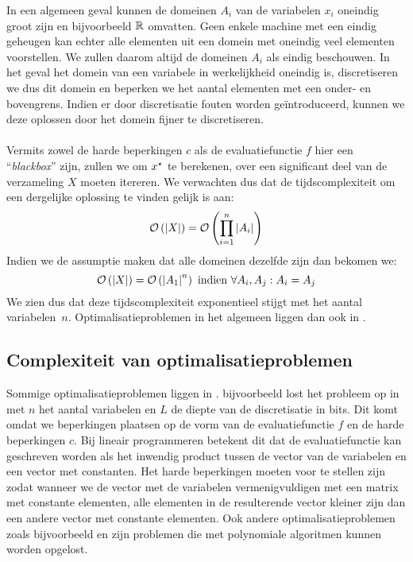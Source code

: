 In een algemeen geval kunnen de domeinen $A_i$ van de variabelen $x_i$ oneindig groot zijn en bijvoorbeeld $\mathbb{R}$ omvatten. Geen enkele machine met een eindig geheugen kan echter alle elementen uit een domein met oneindig veel elementen voorstellen. We zullen daarom altijd de domeinen $A_i$ als eindig beschouwen. In het geval het domein van een variabele in werkelijkheid oneindig is, discretiseren we dus dit domein en beperken we het aantal elementen met een onder- en bovengrens. Indien er door discretisatie fouten worden ge\"introduceerd, kunnen we deze oplossen door het domein fijner te discretiseren.
\paragraph{}
Vermits zowel de harde beperkingen $c$ als de evaluatiefunctie $f$ hier een ``\emph{blackbox}'' zijn, zullen we om $x^{\star}$ te berekenen, over een significant deel van de verzameling $X$ moeten itereren. We verwachten dus dat de tijdscomplexiteit om een dergelijke oplossing te vinden gelijk is aan:
\begin{equation}
\mathcal{O}\left(\left| X\right|\right)=\mathcal{O}\left(\displaystyle\prod_{i=1}^n\left| A_i\right|\right)
\end{equation}
Indien we de assumptie maken dat alle domeinen dezelfde zijn dan bekomen we:
\begin{equation}
\mathcal{O}\left(\left| X\right|\right)=\mathcal{O}\left(\left| A_1\right|^n\right)\mbox{ indien }\forall A_i,A_j: A_i=A_j
\end{equation}
We zien dus dat deze tijdscomplexiteit exponentieel stijgt met het aantal variabelen~$n$. Optimalisatieproblemen in het algemeen liggen dan ook in .

\subsection{Complexiteit van optimalisatieproblemen}

Sommige optimalisatieproblemen liggen in . \cite{linearProgrammingInP} bijvoorbeeld lost het  probleem op in  met $n$ het aantal variabelen en $L$ de diepte van de discretisatie in bits. Dit komt omdat we beperkingen plaatsen op de vorm van de evaluatiefunctie $f$ en de harde beperkingen $c$. Bij lineair programmeren betekent dit dat de evaluatiefunctie kan geschreven worden als het inwendig product tussen de vector van de variabelen en een vector met constanten. Het harde beperkingen moeten voor te stellen zijn zodat wanneer we de vector met de variabelen vermenigvuldigen met een matrix met constante elementen, alle elementen in de resulterende vector kleiner zijn dan een andere vector met constante elementen. Ook andere optimalisatieproblemen zoals bijvoorbeeld  en  zijn problemen die met polynomiale algoritmen kunnen worden opgelost.

